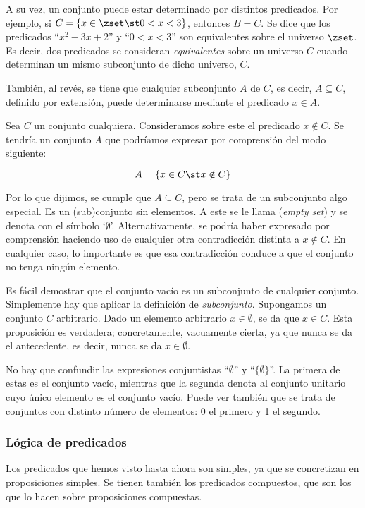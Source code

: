 A su vez, un conjunto puede estar determinado por distintos predicados. Por
ejemplo, si $C = \{x \in \zset \st 0 < x < 3\}$, entonces $B = C$. Se dice
que los predicados ``$x^2 - 3x + 2$'' y ``$0 < x < 3$'' son equivalentes
sobre el universo $\zset$. Es decir, dos predicados se consideran
\emph{equivalentes} sobre un universo $C$ cuando determinan un mismo
subconjunto de dicho universo, $C$.

También, al revés, se tiene que cualquier subconjunto $A$ de $C$, es decir,
$A \subseteq C$, definido por extensión, puede determinarse mediante el
predicado $x \in A$.

Sea $C$ un conjunto cualquiera. Consideramos sobre este el predicado $x
\notin C$. Se tendría un conjunto $A$ que podríamos expresar por comprensión
del modo siguiente:

$$ A = \{x \in C \st x \notin C\} $$

\noindent Por lo que dijimos, se cumple que $A \subseteq C$, pero se trata
de un subconjunto algo especial. Es un (sub)conjunto sin elementos. A este
se le llama  (\emph{empty set}) y se denota con el
símbolo `$\emptyset$'. Alternativamente, se podría haber expresado por
comprensión haciendo uso de cualquier otra contradicción distinta a $x
\notin C$. En cualquier caso, lo importante es que esa contradicción conduce
a que el conjunto no tenga ningún elemento.

Es fácil demostrar que el conjunto vacío es un subconjunto de cualquier
conjunto. Simplemente hay que aplicar la definición de \emph{subconjunto}.
Supongamos un conjunto $C$ arbitrario. Dado un elemento arbitrario $x \in
\emptyset$, se da que $x \in C$. Esta proposición es verdadera;
concretamente, vacuamente cierta, ya que nunca se da el antecedente, es
decir, nunca se da $x \in \emptyset$.

No hay que confundir las expresiones conjuntistas ``$\emptyset$'' y
``$\{\emptyset\}$''. La primera de estas es el conjunto vacío, mientras que
la segunda denota al conjunto unitario cuyo único elemento es el conjunto
vacío. Puede ver también que se trata de conjuntos con distinto número de
elementos: 0 el primero y 1 el segundo.





\subsubsection{Lógica de predicados}

Los predicados que hemos visto hasta ahora son simples, ya que se
concretizan en proposiciones simples. Se tienen también los predicados
compuestos, que son los que lo hacen sobre proposiciones compuestas.

